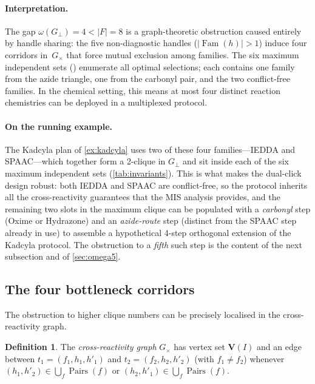 \documentclass[preprint,12pt]{elsarticle}
\theoremstyle{definition}
\newtheorem{definition}[theorem]{Definition}
\theoremstyle{remark}
\newcommand{\Var}{\mathbf{V}}
\DeclareMathOperator{\Fam}{Fam}
\DeclareMathOperator{\Pairs}{Pairs}
\begin{document}
\paragraph{Interpretation.}
The gap $\omega(G_\perp) = 4 < |F| = 8$ is a graph-theoretic
obstruction caused entirely by handle sharing: the five
non-diagnostic handles ($|\Fam(h)| > 1$) induce four corridors
in~$G_\times$ that force mutual exclusion among families.  The six
maximum independent sets () enumerate all
optimal selections; each contains one family from the azide triangle,
one from the carbonyl pair, and the two conflict-free families.
In the chemical setting, this means at most four distinct reaction
chemistries can be deployed in a multiplexed protocol.

\paragraph{On the running example.}
The Kadcyla plan of \cref{ex:kadcyla} uses two of these
four families---IEDDA and SPAAC---which together form a
2-clique in $G_\perp$ and sit inside each of the six maximum
independent sets (\cref{tab:invariants}).  This is what makes the
dual-click design robust: both IEDDA and SPAAC are
conflict-free, so the protocol inherits all the cross-reactivity
guarantees that the MIS analysis provides, and the remaining
two slots in the maximum clique can be populated with a
\emph{carbonyl} step (Oxime or Hydrazone) and an \emph{azide-route}
step (distinct from the SPAAC step already in use) to assemble
a hypothetical 4-step orthogonal extension of the Kadcyla
protocol.  The obstruction to a \emph{fifth} such step is the
content of the next subsection and of \cref{sec:omega5}.


\subsection{The four bottleneck corridors}

The obstruction to higher clique numbers can be precisely
localised in the cross-reactivity graph.

\begin{definition}\label{def:cross-graph}
The \emph{cross-reactivity graph} $G_\times$ has vertex set
$\Var(I)$ and an edge between $t_1 = (f_1, h_1, h'_1)$ and
$t_2 = (f_2, h_2, h'_2)$ (with $f_1 \neq f_2$) whenever
$(h_1, h'_2) \in \bigcup_f \Pairs(f)$ or
$(h_2, h'_1) \in \bigcup_f \Pairs(f)$.
\end{definition}
\end{document}
